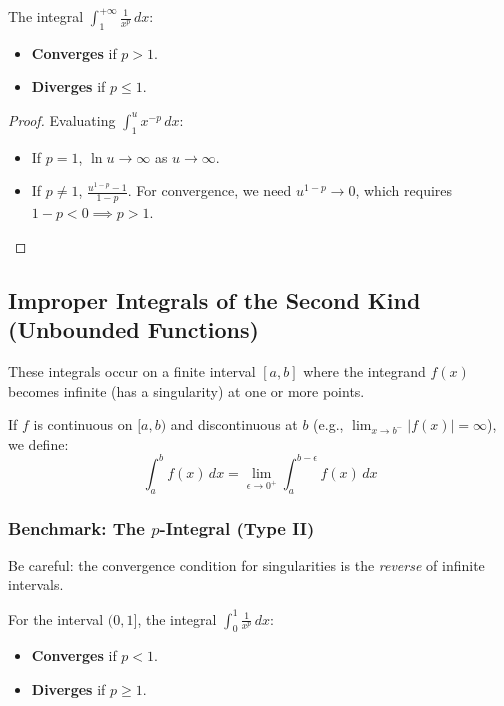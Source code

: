 \begin{theorem}
The integral $\int_1^{+\infty} \frac{1}{x^p} \, dx$:
\begin{itemize}
    \item \textbf{Converges} if $p > 1$.
    \item \textbf{Diverges} if $p \leq 1$.
\end{itemize}
\end{theorem}
\begin{proof}
Evaluating $\int_1^u x^{-p} \, dx$:
\begin{itemize}
    \item If $p=1$, $\ln u \to \infty$ as $u \to \infty$.
    \item If $p \neq 1$, $\frac{u^{1-p}-1}{1-p}$. For convergence, we need $u^{1-p} \to 0$, which requires $1-p < 0 \implies p > 1$.
\end{itemize}
\end{proof}

\subsection{Improper Integrals of the Second Kind (Unbounded Functions)}

These integrals occur on a finite interval $[a,b]$ where the integrand $f(x)$ becomes infinite (has a singularity) at one or more points.

\begin{definition}
If $f$ is continuous on $[a, b)$ and discontinuous at $b$ (e.g., $\lim_{x \to b^-} |f(x)| = \infty$), we define:
\[
\int_a^b f(x) \, dx = \lim_{\epsilon \to 0^+} \int_a^{b-\epsilon} f(x) \, dx
\]
\end{definition}

\subsubsection{Benchmark: The $p$-Integral (Type II)}
Be careful: the convergence condition for singularities is the \textit{reverse} of infinite intervals.

\begin{theorem}
For the interval $(0, 1]$, the integral $\int_0^1 \frac{1}{x^p} \, dx$:
\begin{itemize}
    \item \textbf{Converges} if $p < 1$.
    \item \textbf{Diverges} if $p \geq 1$.
\end{itemize}
\end{theorem}

